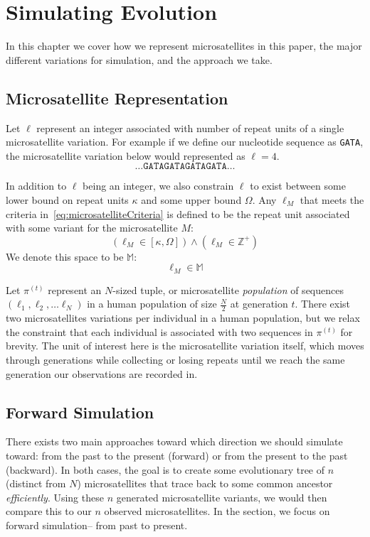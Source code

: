 \chapter{Simulating Evolution}\label{ch:simulatingEvolution}
In this chapter we cover how we represent microsatellites in this paper, the major different variations for simulation,
and the approach we take.

\section{Microsatellite Representation}\label{sec:microsatelliteRepresentation}
Let $\ell$ represent an integer associated with number of repeat units of a single microsatellite variation.
For example if we define our nucleotide sequence as \texttt{GATA}, the microsatellite variation below would represented
as $\ell=4$.
\begin{equation*}
    \ldots \texttt{GATAGATAGATAGATA} \ldots
\end{equation*}

In addition to $\ell$ being an integer, we also constrain $\ell$ to exist between some lower bound on repeat units
$\kappa$ and some upper bound $\Omega$.
Any $\ell_M$ that meets the criteria in~\autoref{eq:microsatelliteCriteria} is defined to be the repeat unit
associated with some variant for the microsatellite $M$:
\begin{equation}\label{eq:microsatelliteCriteria}
    \left(\ell_M \in [\kappa, \Omega]\right) \land \left(\ell_M \in \mathbb{Z}^+\right)
\end{equation}
We denote this space to be $\mathbb{M}$:
\begin{equation}
    \ell_M \in \mathbb{M}
\end{equation}

Let $\pi^{(t)}$ represent an $N$-sized tuple, or microsatellite \emph{population} of sequences
$\left(\ell_1, \ell_2, \ldots \ell_{N}\right)$ in a human population of size $\frac{N}{2}$ at generation $t$.
There exist two microsatellites variations per individual in a human population, but we relax the constraint that
each individual is associated with two sequences in $\pi^{(t)}$ for brevity.
The unit of interest here is the microsatellite variation itself, which moves through generations while collecting or
losing repeats until we reach the same generation our observations are recorded in.

\section{Forward Simulation}\label{sec:forwardSimulation}
There exists two main approaches toward which direction we should simulate toward: from the past to the present
(forward) or from the present to the past (backward).
In both cases, the goal is to create some evolutionary tree of $n$ (distinct from $N$) microsatellites that trace back
to some common ancestor \emph{efficiently}.
Using these $n$ generated microsatellite variants, we would then compare this to our $n$ observed microsatellites.
In the section, we focus on forward simulation-- from past to present.

